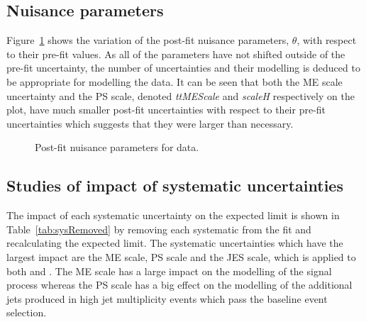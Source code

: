 \subsection{Nuisance parameters}

Figure~\ref{fig:datanuis} shows the variation of the post-fit nuisance parameters, $\theta$, with respect to their pre-fit values. As all of the parameters have not shifted outside of the pre-fit uncertainty, the number of uncertainties and their modelling is deduced to be appropriate for modelling the data. It can be seen that both the \ttbar ME scale uncertainty and the PS scale, denoted \emph{ttMEScale} and \emph{scaleH} respectively on the plot, have much smaller post-fit uncertainties with respect to their pre-fit uncertainties which suggests that they were larger than necessary.

\begin{figure}[h!]
\begin{center}
\hspace{0.2cm}
\end{center}
\caption{Post-fit nuisance parameters for data.}
\label{fig:datanuis}
\end{figure} 

\subsection{Studies of impact of systematic uncertainties}

The impact of each systematic uncertainty on the expected limit is shown in Table~\ref{tab:sysRemoved} by removing each systematic from the fit and recalculating the expected limit. The systematic uncertainties which have the largest impact are the \ttbar ME scale, \ttbar PS scale and the JES scale, which is applied to both \ttbar and \tttt. The \ttbar ME scale has a large impact on the modelling of the signal process whereas the \ttbar PS scale has a big effect on the modelling of the additional jets produced in high jet multiplicity \ttbar events which pass the baseline event selection.

